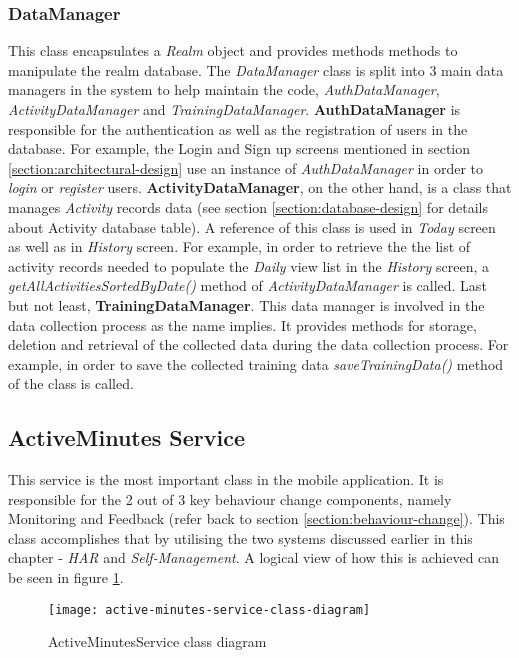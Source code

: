     \subsubsection{DataManager}
    This class encapsulates a \textit{Realm} object and provides methods methods to manipulate the realm database. The \textit{DataManager} class is split into 3 main data managers in the system to help maintain the code, \textit{AuthDataManager}, \textit{ActivityDataManager} and \textit{TrainingDataManager}. \textbf{AuthDataManager} is responsible for the authentication as well as the registration of users in the database. For example, the Login and Sign up screens mentioned in section \ref{section:architectural-design} use an instance of \textit{AuthDataManager} in order to \textit{login} or \textit{register} users. \textbf{ActivityDataManager}, on the other hand, is a class that manages \textit{Activity} records data (see section \ref{section:database-design} for details about Activity database table). A reference of this class is used in \textit{Today} screen as well as in \textit{History} screen. For example, in order to retrieve the the list of activity records needed to populate the \textit{Daily} view list in the \textit{History} screen, a \textit{getAllActivitiesSortedByDate()} method of \textit{ActivityDataManager} is called. Last but not least, \textbf{TrainingDataManager}. This data manager is involved in the data collection process as the name implies. It provides methods for storage, deletion and retrieval of the collected data during the data collection process. For example, in order to save the collected training data \textit{saveTrainingData()} method of the class is called.
    
    
    \subsection{ActiveMinutes Service}
    This service is the most important class in the mobile application. It is responsible for the 2 out of 3 key behaviour change components, namely Monitoring and Feedback (refer back to section \ref{section:behaviour-change}). This class accomplishes that by utilising the two systems discussed earlier in this chapter - \textit{HAR} and \textit{Self-Management}. A logical view of how this is achieved can be seen in figure \ref{fig:active-minutes-service-class-diagram}. 
    
    \begin{figure}[ht]
    \centering
    \texttt{[image: active-minutes-service-class-diagram]}
    \caption{ActiveMinutesService class diagram}
    \label{fig:active-minutes-service-class-diagram}
    \end{figure}
    
